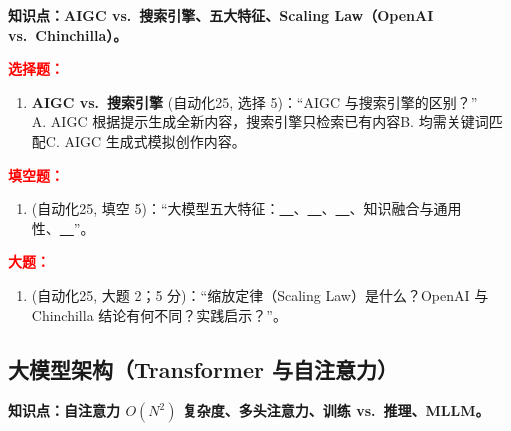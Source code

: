 ﻿\documentclass[../main.tex]{subfiles}
\begin{document}
\noindent\textbf{知识点：AIGC vs.\ 搜索引擎、五大特征、Scaling Law（OpenAI vs.\ Chinchilla）。}

\noindent\textbf{\textcolor{red}{选择题：}}
\begin{enumerate}[itemsep=0.45em, topsep=0.2em, leftmargin=1.5em]
    \item \textbf{AIGC vs.\ 搜索引擎} \textcolor{autoclassgreen}{(自动化25, 选择 5)}：``AIGC 与搜索引擎的区别？''\\
    A. AIGC 根据提示生成全新内容，搜索引擎只检索已有内容\quad B. 均需关键词匹配\quad C. AIGC 生成式模拟创作内容\quad {}。 
\end{enumerate}

\noindent\textbf{\textcolor{red}{填空题：}}
\begin{enumerate}[itemsep=0.3em, topsep=0.2em, leftmargin=1.5em]
    \item \textcolor{autoclassgreen}{(自动化25, 填空 5)}：``大模型五大特征：\underline{\ \ }、\underline{\ \ }、\underline{\ \ }、知识融合与通用性、\underline{\ \ }''。 
\end{enumerate}

\noindent\textbf{\textcolor{red}{大题：}}
\begin{enumerate}[itemsep=0.3em, topsep=0.2em, leftmargin=1.5em]
    \item \textcolor{autoclassgreen}{(自动化25, 大题 2；5 分)}：``缩放定律（Scaling Law）是什么？OpenAI 与 Chinchilla 结论有何不同？实践启示？''。 
\end{enumerate}

\subsection{大模型架构（Transformer 与自注意力）}

\noindent\textbf{知识点：自注意力 $O(N^2)$ 复杂度、多头注意力、训练 vs.\ 推理、MLLM。}
\end{document}
